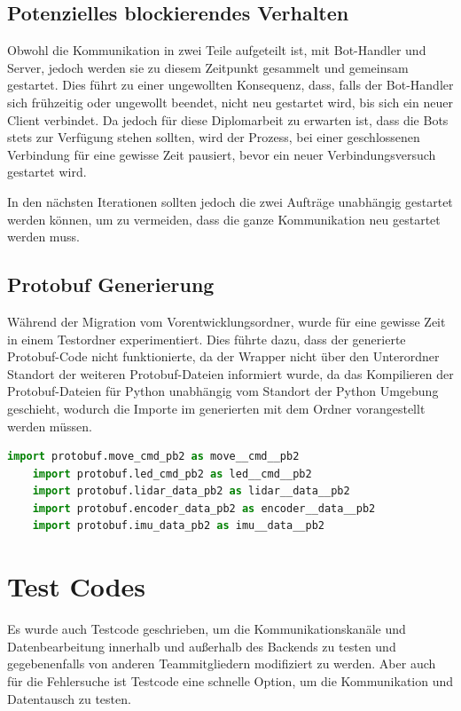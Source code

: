 \subsection{Potenzielles blockierendes Verhalten}
Obwohl die Kommunikation in zwei Teile aufgeteilt ist, 
mit Bot-Handler und Server, 
jedoch werden sie zu diesem Zeitpunkt gesammelt und gemeinsam gestartet.
Dies führt zu einer ungewollten Konsequenz,
dass, falls der Bot-Handler sich frühzeitig oder ungewollt beendet, 
nicht neu gestartet wird, bis sich ein neuer Client verbindet.
% 
Da jedoch für diese Diplomarbeit zu erwarten ist, 
dass die Bots stets zur Verfügung stehen sollten,
wird der Prozess, bei einer geschlossenen Verbindung für eine gewisse Zeit pausiert,
bevor ein neuer Verbindungsversuch gestartet wird.

In den nächsten Iterationen sollten jedoch 
die zwei Aufträge unabhängig gestartet werden können, 
um zu vermeiden, 
dass die ganze Kommunikation neu gestartet werden muss.

\subsection{Protobuf Generierung}
Während der Migration vom Vorentwicklungsordner, 
wurde für eine gewisse Zeit in einem Testordner experimentiert.
Dies führte dazu, dass der generierte Protobuf-Code nicht funktionierte,
da der Wrapper nicht über den Unterordner Standort  
der weiteren Protobuf-Dateien informiert wurde,
da das Kompilieren der Protobuf-Dateien für Python unabhängig vom Standort
der Python Umgebung geschieht, 
wodurch die Importe im generierten 
mit dem Ordner vorangestellt werden müssen.

\begin{lstlisting}[language=python, gobble=4]
    import protobuf.move_cmd_pb2 as move__cmd__pb2
    import protobuf.led_cmd_pb2 as led__cmd__pb2
    import protobuf.lidar_data_pb2 as lidar__data__pb2
    import protobuf.encoder_data_pb2 as encoder__data__pb2
    import protobuf.imu_data_pb2 as imu__data__pb2
\end{lstlisting}


\section{Test Codes}
Es wurde auch Testcode geschrieben, 
um die Kommunikationskanäle und Datenbearbeitung innerhalb 
und außerhalb des Backends zu testen und gegebenenfalls 
von anderen Teammitgliedern modifiziert zu werden.
% 
Aber auch für die Fehlersuche ist Testcode eine schnelle Option, 
um die Kommunikation und Datentausch zu testen.

